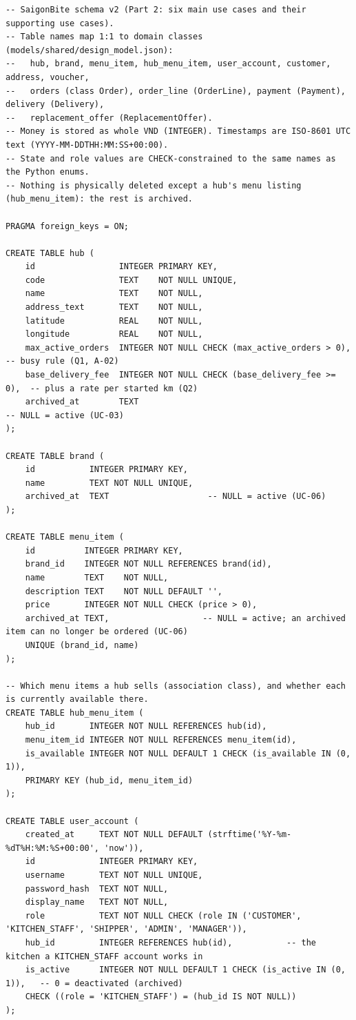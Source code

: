 \begin{lstlisting}
-- SaigonBite schema v2 (Part 2: six main use cases and their supporting use cases).
-- Table names map 1:1 to domain classes (models/shared/design_model.json):
--   hub, brand, menu_item, hub_menu_item, user_account, customer, address, voucher,
--   orders (class Order), order_line (OrderLine), payment (Payment), delivery (Delivery),
--   replacement_offer (ReplacementOffer).
-- Money is stored as whole VND (INTEGER). Timestamps are ISO-8601 UTC text (YYYY-MM-DDTHH:MM:SS+00:00).
-- State and role values are CHECK-constrained to the same names as the Python enums.
-- Nothing is physically deleted except a hub's menu listing (hub_menu_item): the rest is archived.

PRAGMA foreign_keys = ON;

CREATE TABLE hub (
    id                 INTEGER PRIMARY KEY,
    code               TEXT    NOT NULL UNIQUE,
    name               TEXT    NOT NULL,
    address_text       TEXT    NOT NULL,
    latitude           REAL    NOT NULL,
    longitude          REAL    NOT NULL,
    max_active_orders  INTEGER NOT NULL CHECK (max_active_orders > 0),   -- busy rule (Q1, A-02)
    base_delivery_fee  INTEGER NOT NULL CHECK (base_delivery_fee >= 0),  -- plus a rate per started km (Q2)
    archived_at        TEXT                                              -- NULL = active (UC-03)
);

CREATE TABLE brand (
    id           INTEGER PRIMARY KEY,
    name         TEXT NOT NULL UNIQUE,
    archived_at  TEXT                    -- NULL = active (UC-06)
);

CREATE TABLE menu_item (
    id          INTEGER PRIMARY KEY,
    brand_id    INTEGER NOT NULL REFERENCES brand(id),
    name        TEXT    NOT NULL,
    description TEXT    NOT NULL DEFAULT '',
    price       INTEGER NOT NULL CHECK (price > 0),
    archived_at TEXT,                   -- NULL = active; an archived item can no longer be ordered (UC-06)
    UNIQUE (brand_id, name)
);

-- Which menu items a hub sells (association class), and whether each is currently available there.
CREATE TABLE hub_menu_item (
    hub_id       INTEGER NOT NULL REFERENCES hub(id),
    menu_item_id INTEGER NOT NULL REFERENCES menu_item(id),
    is_available INTEGER NOT NULL DEFAULT 1 CHECK (is_available IN (0, 1)),
    PRIMARY KEY (hub_id, menu_item_id)
);

CREATE TABLE user_account (
    created_at     TEXT NOT NULL DEFAULT (strftime('%Y-%m-%dT%H:%M:%S+00:00', 'now')),
    id             INTEGER PRIMARY KEY,
    username       TEXT NOT NULL UNIQUE,
    password_hash  TEXT NOT NULL,
    display_name   TEXT NOT NULL,
    role           TEXT NOT NULL CHECK (role IN ('CUSTOMER', 'KITCHEN_STAFF', 'SHIPPER', 'ADMIN', 'MANAGER')),
    hub_id         INTEGER REFERENCES hub(id),           -- the kitchen a KITCHEN_STAFF account works in
    is_active      INTEGER NOT NULL DEFAULT 1 CHECK (is_active IN (0, 1)),   -- 0 = deactivated (archived)
    CHECK ((role = 'KITCHEN_STAFF') = (hub_id IS NOT NULL))
);


\end{lstlisting}
